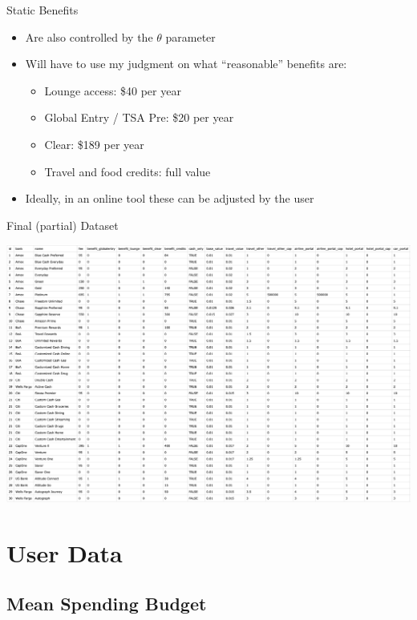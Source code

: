 \begin{frame}{Static Benefits}
    \begin{itemize}
        \item Are also controlled by the $\theta$ parameter
        \item Will have to use my judgment on what ``reasonable'' benefits are:
        \begin{itemize}
            \item Lounge access: \$40 per year
            \item Global Entry / TSA Pre\Checkmark: \$20 per year
            \item Clear: \$189 per year
            \item Travel and food credits: full value 
        \end{itemize}
        \item Ideally, in an online tool these can be adjusted by the user
    \end{itemize}
\end{frame}

\begin{frame}{Final (partial) Dataset}
    \begin{center}
        \includegraphics[width=1.0\textwidth]{../Misc/CreditCardsCSV.png}
    \end{center}
\end{frame}

\section{User Data}

\subsection{Mean Spending Budget}

